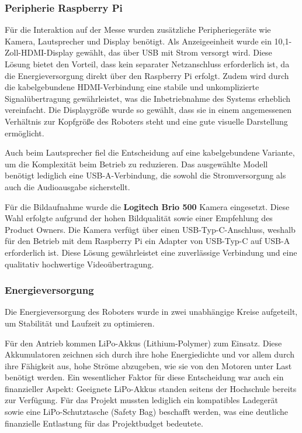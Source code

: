 \subsubsection{Peripherie Raspberry Pi}

Für die Interaktion auf der Messe wurden zusätzliche Peripheriegeräte wie Kamera, Lautsprecher und Display benötigt. Als Anzeigeeinheit wurde ein 10,1-Zoll-HDMI-Display gewählt, das über USB mit Strom versorgt wird. Diese Lösung bietet den Vorteil, dass kein separater Netzanschluss erforderlich ist, da die Energieversorgung direkt über den Raspberry Pi erfolgt. Zudem wird durch die kabelgebundene HDMI-Verbindung eine stabile und unkomplizierte Signalübertragung gewährleistet, was die Inbetriebnahme des Systems erheblich vereinfacht. Die Displaygröße wurde so gewählt, dass sie in einem angemessenen Verhältnis zur Kopfgröße des Roboters steht und eine gute visuelle Darstellung ermöglicht.


Auch beim Lautsprecher fiel die Entscheidung auf eine kabelgebundene Variante, um die Komplexität beim Betrieb zu reduzieren. Das ausgewählte Modell benötigt lediglich eine USB-A-Verbindung, die sowohl die Stromversorgung als auch die Audioausgabe sicherstellt. 


Für die Bildaufnahme wurde die \textbf{Logitech Brio 500} Kamera eingesetzt. Diese Wahl erfolgte aufgrund der hohen Bildqualität sowie einer Empfehlung des Product Owners. Die Kamera verfügt über einen USB-Typ-C-Anschluss, weshalb für den Betrieb mit dem Raspberry Pi ein Adapter von USB-Typ-C auf USB-A erforderlich ist. Diese Lösung gewährleistet eine zuverlässige Verbindung und eine qualitativ hochwertige Videoübertragung.

\subsubsection{Energieversorgung}


Die Energieversorgung des Roboters wurde in zwei unabhängige Kreise aufgeteilt, um Stabilität und Laufzeit zu optimieren.

Für den Antrieb kommen LiPo-Akkus (Lithium-Polymer) zum Einsatz. Diese Akkumulatoren zeichnen sich durch ihre hohe Energiedichte und vor allem durch ihre Fähigkeit aus, hohe Ströme abzugeben, wie sie von den Motoren unter Last benötigt werden. Ein wesentlicher Faktor für diese Entscheidung war auch ein finanzieller Aspekt: Geeignete LiPo-Akkus standen seitens der Hochschule bereits zur Verfügung. Für das Projekt mussten lediglich ein kompatibles Ladegerät sowie eine LiPo-Schutztasche (Safety Bag) beschafft werden, was eine deutliche finanzielle Entlastung für das Projektbudget bedeutete.

